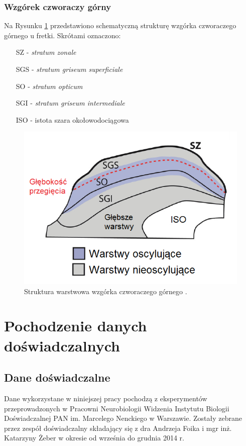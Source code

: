 \documentclass{pracamgr_2}
\begin{document}
\subsection{Wzgórek czworaczy górny}
Na Rysunku \ref{rys:SC_warstwy} przedstawiono schematyczną strukturę wzgórka czworaczego górnego u fretki. \newline Skrótami oznaczono:
\begin{itemize}
	\item[SZ] - \textit{stratum zonale}
	\item[SGS] - \textit{stratum griseum superficiale}
	\item[SO] - \textit{stratum opticum}
	\item[SGI] - \textit{stratum griseum intermediale}
	\item[ISO] - istota szara okołowodociągowa
\end{itemize}
\begin{figure}[htbp]
	\begin{center}
		\includegraphics[scale=0.55]{SC_warstwy.png}
	\end{center}
	\caption{Struktura warstwowa wzgórka czworaczego górnego \citep{SC_warstwy}.}
	\label{rys:SC_warstwy}
\end{figure}
\chapter{Pochodzenie danych doświadczalnych}
\section{Dane doświadczalne}
Dane wykorzystane w niniejszej pracy pochodzą z eksperymentów przeprowadzonych w Pracowni Neurobiologii Widzenia Instytutu Biologii Doświadczalnej PAN im. Marcelego Nenckiego w Warszawie. Zostały zebrane przez zespół doświadczalny składający się z dra Andrzeja Foika i mgr inż. Katarzyny Żeber w okresie od września do grudnia 2014 r.
\end{document}
